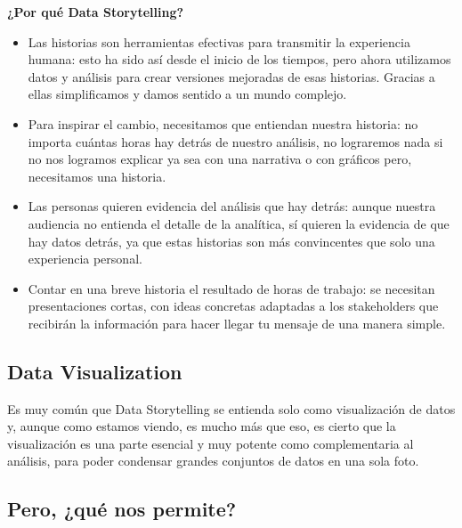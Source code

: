 \documentclass[preprint,12pt]{elsarticle}
\begin{document}
	\textbf{¿Por qué Data Storytelling?}

	\begin{itemize}
		\item Las historias son herramientas efectivas para transmitir la experiencia humana: esto ha sido así desde el inicio de los tiempos, pero ahora utilizamos datos y análisis para crear versiones mejoradas de esas historias. Gracias a ellas simplificamos y damos sentido a un mundo complejo.
		\item Para inspirar el cambio, necesitamos que entiendan nuestra historia: no importa cuántas horas hay detrás de nuestro análisis, no lograremos nada si no nos logramos explicar ya sea con una narrativa o con gráficos pero, necesitamos una historia.

		\item Las personas quieren evidencia del análisis que hay detrás: aunque nuestra audiencia no entienda el detalle de la analítica, sí quieren la evidencia de que hay datos detrás, ya que estas historias son más convincentes que solo una experiencia personal.

		\item Contar en una breve historia el resultado de horas de trabajo: se necesitan presentaciones cortas, con ideas concretas adaptadas a los stakeholders que recibirán la información para hacer llegar tu mensaje de una manera simple. 	
	\end{itemize}

	\subsection{Data Visualization}

	Es muy común que Data Storytelling se entienda solo como visualización de datos y, aunque como estamos viendo, es mucho más que eso, es cierto que la visualización es una parte esencial y muy potente como complementaria al análisis, para poder condensar grandes conjuntos de datos en una sola foto.\\

\subsection{Pero, ¿qué nos permite?}
	
\end{document}
